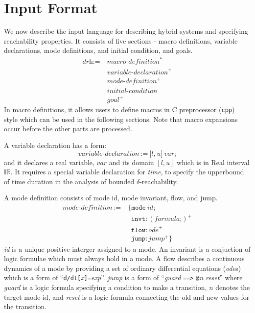 \section{Input Format}\label{sec:input-format}

We now describe the input language for describing hybrid systems and
specifying reachability properties. It consists of five sections
- macro definitions, variable declarations, mode definitions, and
initial condition, and goals.
\begin{align*}
  \textit{drh} := \ & \textit{macro-definition}^*\\
                    & \textit{variable-declaration}^+\\
                    & \textit{mode-definition}^+\\
                    & \textit{initial-condition}\\
                    & \textit{goal}^+
\end{align*}
In macro definitions, it allows users to define macros in C
preprocessor (\texttt{cpp}) style which can be used in the following
sections. Note that macro expansions occur before the other parts are processed.

A variable declaration has a form:
\[
\textit{variable-declaration} \ := \ \texttt{[}
                                     \textit{l}
                                     \texttt{,}
                                     \ \textit{u}
                                     \texttt{]}
                                     \ \textit{var}
                                     \texttt{;}
\]
and it declares a real variable, $var$ and its domain $[l, u]$ which
is in Real interval $\mathbb{IR}$. It requires a special variable
declaration for \textit{time}, to specify the upperbound of time
duration in the analysis of bounded $\delta$-reachability.

A mode definition consists of mode id, mode invariant, flow, and jump.
\begin{align*}
  \textit{mode-definition} \ := & \ \texttt{\{}
                                    \texttt{mode} \ \textit{id}\texttt{;}\\
                           & \ \ \  \texttt{invt}:(\textit{formula} \texttt{;})^+\\
                           & \ \ \  \texttt{flow}:\textit{ode}^+\\
                           & \ \ \ \texttt{jump}:\textit{jump}^+ \texttt{\}}
\end{align*}
\textit{id} is a unique positive interger assigned to a mode. An
invariant is a conjuction of logic formulae which must always hold in
a mode. A flow describes a continuous dynamics of a mode by providing
a set of ordinary differential equations (\textit{ode}s) which is a
form of
``\texttt{d/dt[}\textit{x}\texttt{]=}\textit{exp}''. \textit{jump} is
a form of ``\textit{guard} \texttt{==>} \texttt{@}\textit{n}
\textit{reset}'' where \textit{guard} is a logic formula specifying a
condition to make a transition, $n$ denotes the target mode-id, and
\textit{reset} is a logic formula connecting the old and new values
for the transition.

